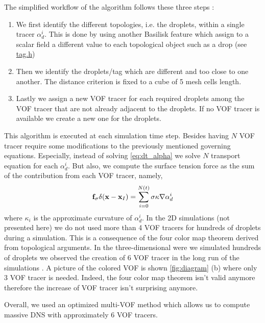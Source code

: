 The simplified workflow of the algorithm follows these three steps : 
\begin{enumerate}
    \item We first identify the different topologies, i.e. the droplets, within a single tracer $\alpha_d^i$. 
    This is done by using another Basilisk feature which assign to a scalar field a different value to each topological object such as a drop (see \href{http://basilisk.fr/src/tag.h}{tag.h})
    \item Then we identify the droplets/tag which are different and too close to one another.
    The distance criterion is fixed to a cube of 5 mesh cells length.  
    \item Lastly we assign a new VOF tracer for each required droplets among the VOF tracer that are not already adjacent to the droplets. 
    If no VOF tracer is available we create a new one for the droplets.
\end{enumerate}
This algorithm is executed at each simulation time step. 
Besides having $N$ VOF tracer require some modifications to the previously mentioned governing equations. 
Especially, instead of solving \ref{eq:dt_alpha}  we solve $N$ transport equation for each $\alpha_d^i$.
But also, we compute the surface tension force as the sum of the contribution from each VOF tracer, namely, 
\begin{equation}
    \textbf{f}_\sigma \delta(\textbf{x}-\textbf{x}_I)
    = \sum_{i=0}^{N(t)} \sigma \kappa \mathbf{\nabla} \alpha_d^i
\end{equation} 
where $\kappa_i$ is the approximate curvature of $\alpha_d^i$. 
In the 2D simulations (not presented here) we do not used more than 4 VOF tracers for hundreds of droplets during a simulation. 
This is a consequence  of the four color map theorem derived from topological arguments.
In the three-dimensional were we simulated hundreds of droplets we observed the creation of $6$ VOF tracer in the long run of the simulations .
A picture of the colored VOF is shown \ref{fig:diagram} (b) where only 3 VOF tracer is needed.
Indeed, the four color map theorem isn't valid anymore therefore the increase of VOF tracer isn't surprising anymore. 

Overall, we used an optimized multi-VOF method which allows us to compute massive DNS with approximately $6$ VOF tracers. 





